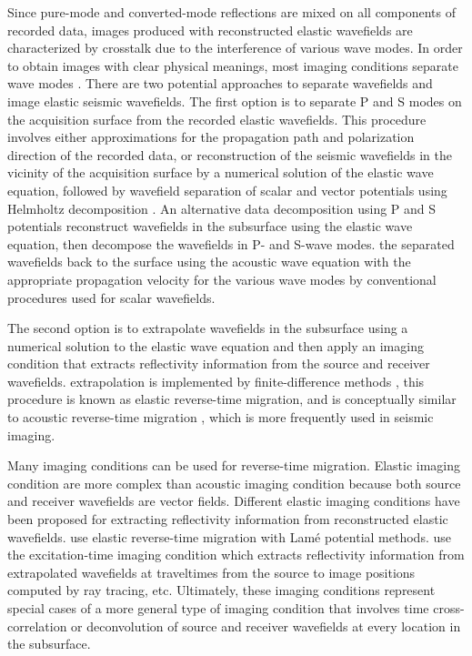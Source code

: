 Since pure-mode and converted-mode reflections are mixed on all
components of recorded data, images produced with reconstructed
elastic wavefields are characterized by crosstalk due to the
interference of various wave modes. In order to obtain images with
clear physical meanings, most imaging conditions separate wave modes
. There
are two potential approaches to separate wavefields and image elastic
seismic wavefields.  The first option is to separate P and S modes on
the acquisition surface from the recorded elastic wavefields. This
procedure involves either approximations for the propagation path and
polarization direction of the recorded data, or reconstruction of the
seismic wavefields in the vicinity of the acquisition surface by a
numerical solution of the elastic wave equation, followed by wavefield
separation of scalar and vector potentials using Helmholtz
decomposition \cite[]{etgen:972,GEO62-02-05980613}.  An alternative
data decomposition using P and S potentials 
reconstruct wavefields in the subsurface using the elastic
wave equation, then decompose the wavefields in P-
and S-wave modes. 
the separated wavefields back to the surface using the acoustic wave
equation with the appropriate propagation velocity for the various
wave modes \cite[]{sun.elastic.rtm} by conventional procedures used
for scalar wavefields.

The second option is to extrapolate wavefields in the subsurface using
a numerical solution to the elastic wave equation and then apply an
imaging condition that extracts reflectivity information from the
source and receiver wavefields.   extrapolation is implemented by finite-difference methods
\cite[]{chang:67,chang:597}, this procedure is known as elastic
reverse-time migration, and is conceptually similar to acoustic
reverse-time migration \cite[]{GEO48-11-15141524}, which is more
frequently used in seismic imaging.

Many imaging conditions can be used for reverse-time migration.
Elastic imaging condition are more complex than
acoustic imaging condition because both source and receiver
wavefields are vector fields.  Different elastic imaging conditions
have been proposed for extracting reflectivity information from
reconstructed elastic wavefields. \cite{GEO63-05-16851695} use elastic reverse-time migration with
Lam\'e potential methods. \cite{chang:67} use the excitation-time
imaging condition which extracts reflectivity information from
extrapolated wavefields at traveltimes from the source to image
positions computed by ray tracing, etc. Ultimately, these imaging
conditions represent special cases of a more general type of imaging
condition that involves time cross-correlation or deconvolution of
source and receiver wavefields at every location in the subsurface.


